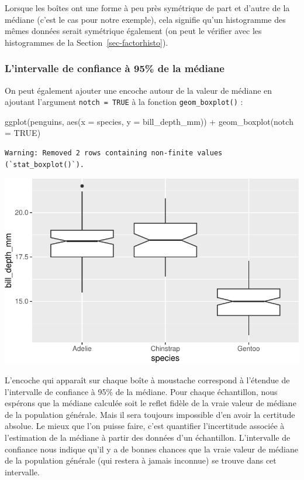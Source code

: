 \documentclass[
  a4paper,
  DIV=11,
  numbers=noendperiod,
  oneside]{scrreprt}
\newenvironment{Shaded}{}{}
\newcommand{\AttributeTok}[1]{\textcolor[rgb]{0.84,0.23,0.29}{#1}}
\newcommand{\ConstantTok}[1]{\textcolor[rgb]{0.00,0.36,0.77}{#1}}
\newcommand{\FunctionTok}[1]{\textcolor[rgb]{0.44,0.26,0.76}{#1}}
\newcommand{\NormalTok}[1]{\textcolor[rgb]{0.14,0.16,0.18}{#1}}
\newcommand{\SpecialCharTok}[1]{\textcolor[rgb]{0.00,0.36,0.77}{#1}}
\begin{document}
Lorsque les boîtes ont une forme à peu près symétrique de part et
d'autre de la médiane (c'est le cas pour notre exemple), cela signifie
qu'un histogramme des mêmes données serait symétrique également (on peut
le vérifier avec les histogrammes de la Section~\ref{sec-factorhisto}).

\subsubsection{L'intervalle de confiance à 95\% de la
médiane}\label{lintervalle-de-confiance-uxe0-95-de-la-muxe9diane}

On peut également ajouter une encoche autour de la valeur de médiane en
ajoutant l'argument \texttt{notch\ =\ TRUE} à la fonction
\texttt{geom\_boxplot()} :

\begin{Shaded}
\begin{Highlighting}[]
\FunctionTok{ggplot}\NormalTok{(penguins, }\FunctionTok{aes}\NormalTok{(}\AttributeTok{x =}\NormalTok{ species, }\AttributeTok{y =}\NormalTok{ bill\_depth\_mm)) }\SpecialCharTok{+}
  \FunctionTok{geom\_boxplot}\NormalTok{(}\AttributeTok{notch =} \ConstantTok{TRUE}\NormalTok{)}
\end{Highlighting}
\end{Shaded}

\begin{verbatim}
Warning: Removed 2 rows containing non-finite values (`stat_boxplot()`).
\end{verbatim}

\includegraphics{03-visualization_files/figure-pdf/unnamed-chunk-73-1.pdf}

L'encoche qui apparaît sur chaque boîte à moustache correspond à
l'étendue de l'intervalle de confiance à 95\% de la médiane. Pour chaque
échantillon, nous espérons que la médiane calculée soit le reflet fidèle
de la vraie valeur de médiane de la population générale. Mais il sera
toujours impossible d'en avoir la certitude absolue. Le mieux que l'on
puisse faire, c'est quantifier l'incertitude associée à l'estimation de
la médiane à partir des données d'un échantillon. L'intervalle de
confiance nous indique qu'il y a de bonnes chances que la vraie valeur
de médiane de la population générale (qui restera à jamais inconnue) se
trouve dans cet intervalle.
\end{document}
